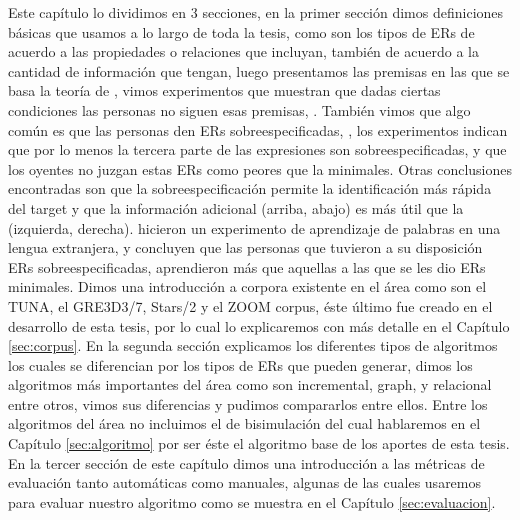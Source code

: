 Este cap\'itulo lo dividimos en 3 secciones, en la primer secci\'on dimos definiciones b\'asicas que usamos a lo largo de toda la tesis, 
como son los tipos de ERs de acuerdo a las propiedades o relaciones que incluyan, tambi\'en de acuerdo a la cantidad de informaci\'on que 
tengan, luego presentamos las premisas en las que se basa la teor\'ia de \cite{clark1992arenas,clark96,Clark-Marshall81}, vimos experimentos que muestran que dadas ciertas condiciones las personas no siguen esas premisas, 
\cite{keysar:Curr98}. Tambi\'en vimos que algo com\'un es que las personas den ERs sobreespecificadas, \cite{arts,Engelhardt_Bailey_Ferreira_2006}, los experimentos 
indican que por lo menos la tercera parte de las expresiones son sobreespecificadas, y que los oyentes no juzgan estas ERs como peores que 
la minimales. Otras conclusiones encontradas son que la sobreespecificaci\'on permite la identificaci\'on m\'as r\'apida del target y que la 
informaci\'on adicional (arriba, abajo) es m\'as \'util que la (izquierda, derecha). \cite{Lu_sasha2015} hicieron un experimento de 
aprendizaje de palabras en una lengua extranjera, y concluyen que las personas que tuvieron a su disposici\'on ERs sobreespecificadas, 
aprendieron m\'as que aquellas a las que se les dio ERs minimales. Dimos una introducci\'on a corpora existente en el \'area 
como son el TUNA, el GRE3D3/7, Stars/2 y el ZOOM corpus, \'este \'ultimo fue creado en el desarrollo de esta tesis, por lo cual lo explicaremos con m\'as detalle en el Cap\'itulo \ref{sec:corpus}. En la segunda secci\'on explicamos los diferentes tipos de algoritmos los cuales se 
diferencian por los tipos de ERs que pueden generar, dimos los algoritmos m\'as importantes del \'area como son incremental, graph, y relacional entre otros, vimos sus diferencias y pudimos compararlos entre ellos. Entre los algoritmos del \'area no incluimos el de 
bisimulaci\'on del cual hablaremos en el Cap\'itulo \ref{sec:algoritmo} por ser \'este el algoritmo base de los aportes de esta tesis. En la tercer secci\'on de este cap\'itulo dimos una introducci\'on a las m\'etricas de evaluaci\'on tanto autom\'aticas como manuales, algunas de las cuales usaremos para evaluar nuestro algoritmo como se muestra en el Cap\'itulo \ref{sec:evaluacion}.

